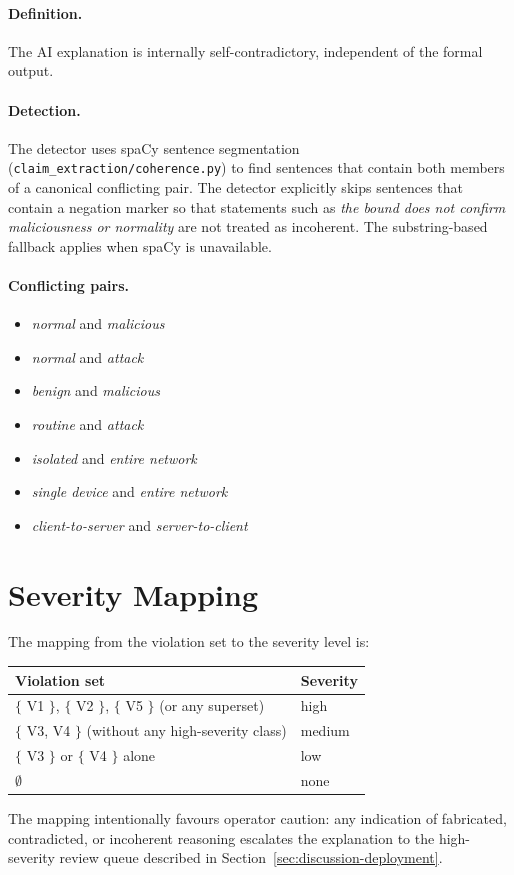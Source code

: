\paragraph{Definition.}
The AI explanation is internally self-contradictory, independent of the
formal output.

\paragraph{Detection.}
The detector uses spaCy sentence segmentation
(\texttt{claim\_extraction/coherence.py}) to find sentences that contain
both members of a canonical conflicting pair. The detector explicitly
skips sentences that contain a negation marker so that statements such as
\emph{the bound does not confirm maliciousness or normality} are not
treated as incoherent. The substring-based fallback applies when spaCy is
unavailable.

\paragraph{Conflicting pairs.}
\begin{itemize}
  \item \emph{normal} and \emph{malicious}
  \item \emph{normal} and \emph{attack}
  \item \emph{benign} and \emph{malicious}
  \item \emph{routine} and \emph{attack}
  \item \emph{isolated} and \emph{entire network}
  \item \emph{single device} and \emph{entire network}
  \item \emph{client-to-server} and \emph{server-to-client}
\end{itemize}

\section{Severity Mapping}
\label{sec:appendix-severity}

The mapping from the violation set to the severity level is:

\begin{center}
\begin{tabular}{ll}
  \toprule
  Violation set & Severity \\
  \midrule
  $\{$ V1 $\}$, $\{$ V2 $\}$, $\{$ V5 $\}$ (or any superset) & high \\
  $\{$ V3, V4 $\}$ (without any high-severity class) & medium \\
  $\{$ V3 $\}$ or $\{$ V4 $\}$ alone & low \\
  $\emptyset$ & none \\
  \bottomrule
\end{tabular}
\end{center}

The mapping intentionally favours operator caution: any indication of
fabricated, contradicted, or incoherent reasoning escalates the
explanation to the high-severity review queue described in
Section~\ref{sec:discussion-deployment}.
